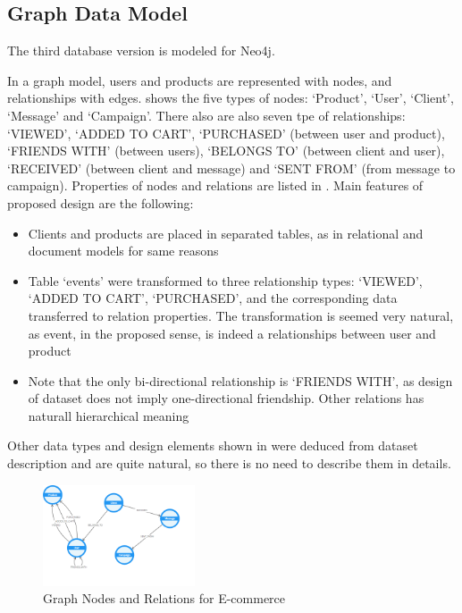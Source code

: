 \documentclass[conference]{IEEEtran}
\begin{document}
\subsection{Graph Data Model}
The third database version is modeled for Neo4j.

In a graph model, users and products are represented with nodes, and relationships with edges.
 shows the five types of nodes: `Product', `User', `Client', `Message' and `Campaign'. There also are also seven tpe of relationships: `VIEWED', `ADDED TO CART', `PURCHASED' (between user and product), `FRIENDS WITH' (between users), `BELONGS TO' (between client and user), `RECEIVED' (between client and message) and `SENT FROM' (from message to campaign). Properties of nodes and relations are listed in . Main features of proposed design are the following:
\begin{itemize}
    \item Clients and products are placed in separated tables, as in relational and document models for same reasons
    \item Table `events' were transformed to three relationship types: `VIEWED', `ADDED TO CART', `PURCHASED', and the corresponding data transferred to relation properties. The transformation is seemed very natural, as event, in the proposed sense, is indeed a relationships between user and product
    \item Note that the only bi-directional relationship is `FRIENDS WITH', as design of dataset does not imply one-directional friendship. Other relations has naturall hierarchical meaning
\end{itemize}
Other data types and design elements shown in  were deduced from dataset description and are quite natural, so there is no need to describe them in details.

\begin{figure}[htbp]
    \centerline{\includegraphics[width=0.4\textwidth]{../screenshots/Neo4jModel.png}}
    \caption{Graph Nodes and Relations for E-commerce}\label{fig:neo4j_model}
\end{figure}
\end{document}
